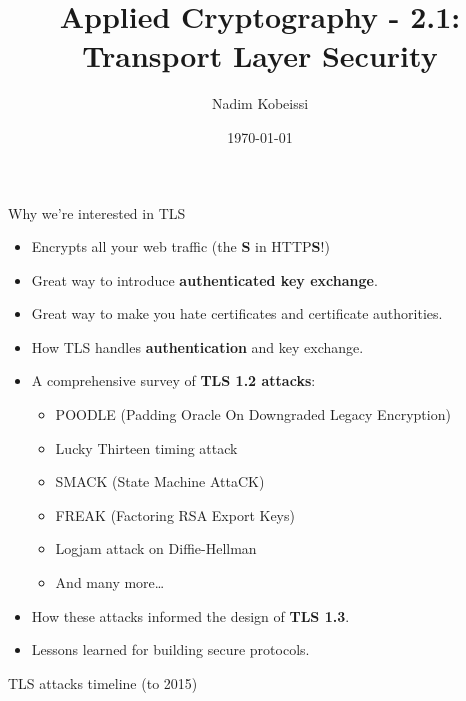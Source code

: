 \documentclass[aspectratio=169, lualatex, handout]{beamer}
\title{Applied Cryptography - 2.1: Transport Layer Security}
\author{Nadim Kobeissi}
\institute{American University of Beirut}
\date{\today}
\begin{document}
\begin{frame}[plain]
	\titlepage
\end{frame}

\begin{frame}{Why we're interested in TLS}
	\begin{itemize}
		\item Encrypts all your web traffic (the \textbf{S} in HTTP\textbf{S}!)
		\item Great way to introduce \textbf{authenticated key exchange}.
		\item Great way to make you hate certificates and certificate authorities.
		\item How TLS handles \textbf{authentication} and key exchange.
		\item A comprehensive survey of \textbf{TLS 1.2 attacks}:
		      \begin{itemize}
			      \item POODLE (Padding Oracle On Downgraded Legacy Encryption)
			      \item Lucky Thirteen timing attack
			      \item SMACK (State Machine AttaCK)
			      \item FREAK (Factoring RSA Export Keys)
			      \item Logjam attack on Diffie-Hellman
			      \item And many more\ldots
		      \end{itemize}
		\item How these attacks informed the design of \textbf{TLS 1.3}.
		\item Lessons learned for building secure protocols.
	\end{itemize}
\end{frame}

\begin{frame}{TLS attacks timeline (to 2015)}
\end{frame}
\end{document}
